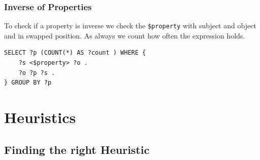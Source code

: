 \subsubsection*{Inverse of Properties}
To check if a property is inverse we check the \texttt{\$property} with subject
and object and in swapped position. As always we count how often the expression
holds.
\begin{lstlisting} 
SELECT ?p (COUNT(*) AS ?count ) WHERE {
	?s <$property> ?o .
	?o ?p ?s .
} GROUP BY ?p
\end{lstlisting}



\section{Heuristics}
\subsection{Finding the right Heuristic}


